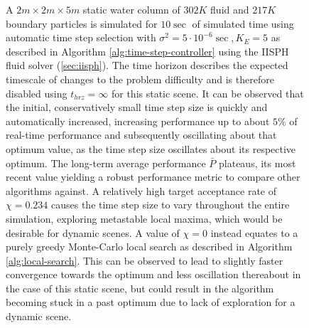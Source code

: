 \documentclass[oneside, a4paper]{book}
\newcommand\br[1]{\left(#1\right)}
\begin{document}
\begin{figure}
      \caption{A $2m\times 2m\times 5m$ static water column of $302K$ fluid and $217K$ boundary particles is simulated for $10\sec$ of simulated time using automatic time step selection with $\sigma^2 = 5\cdot 10^{-6}\sec, K_E=5$ as described in Algorithm \ref{alg:time-step-controller} using the IISPH fluid solver (\autoref{sec:iisph}). The time horizon describes the expected timescale of changes to the problem difficulty and is therefore disabled using $t_{hrz}=\infty$ for this static scene. It can be observed that the initial, conservatively small time step size is quickly and automatically increased, increasing performance up to about $5\%$ of real-time performance and subsequently oscillating about that optimum value, as the time step size oscillates about its respective optimum. The long-term average performance $\bar{P}$ plateaus, its most recent value yielding a robust performance metric to compare other algorithms against. A relatively high target acceptance rate of $\chi=0.234$ causes the time step size to vary throughout the entire simulation, exploring metastable local maxima, which would be desirable for dynamic scenes. A value of $\chi=0$ instead equates to a purely greedy Monte-Carlo local search as described in Algorithm \ref{alg:local-search}. This can be observed to lead to slightly faster convergence towards the optimum and less oscillation thereabout in the case of this static scene, but could result in the algorithm becoming stuck in a past optimum due to lack of exploration for a dynamic scene.}
      \label{fig:metropolis-dt-plots}
  \end{figure}
    

    
\end{document}
